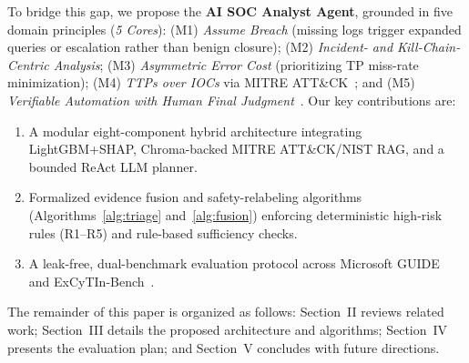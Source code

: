 To bridge this gap, we propose the \textbf{AI SOC Analyst Agent}, grounded in five domain principles (\emph{5 Cores}): (M1) \emph{Assume Breach} (missing logs trigger expanded queries or escalation rather than benign closure); (M2) \emph{Incident- and Kill-Chain-Centric Analysis}; (M3) \emph{Asymmetric Error Cost} (prioritizing TP miss-rate minimization); (M4) \emph{TTPs over IOCs} via MITRE ATT\&CK~\cite{strom2020,bianco2014}; and (M5) \emph{Verifiable Automation with Human Final Judgment}~\cite{nist2025}. Our key contributions are:
\begin{enumerate}
    \item A modular eight-component hybrid architecture integrating LightGBM+SHAP, Chroma-backed MITRE ATT\&CK/NIST RAG, and a bounded ReAct LLM planner.
    \item Formalized evidence fusion and safety-relabeling algorithms (Algorithms~\ref{alg:triage} and~\ref{alg:fusion}) enforcing deterministic high-risk rules (R1--R5) and rule-based sufficiency checks.
    \item A leak-free, dual-benchmark evaluation protocol across Microsoft GUIDE~\cite{freitas2024} and ExCyTIn-Bench~\cite{wu2026}.
\end{enumerate}

The remainder of this paper is organized as follows: Section~II reviews related work; Section~III details the proposed architecture and algorithms; Section~IV presents the evaluation plan; and Section~V concludes with future directions.
